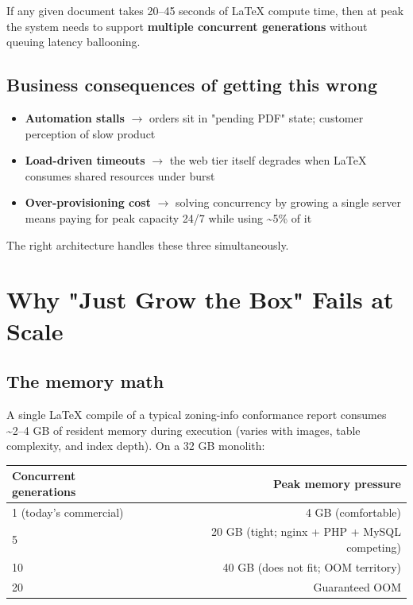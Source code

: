 \documentclass[11pt,letterpaper]{article}
\begin{document}
If any given document takes 20--45 seconds of LaTeX compute time, then at peak the system needs to support \textbf{multiple concurrent generations} without queuing latency ballooning.

\subsection{Business consequences of getting this wrong}
\begin{itemize}[nosep]
  \item \textbf{Automation stalls} $\rightarrow$ orders sit in "pending PDF" state; customer perception of slow product
  \item \textbf{Load-driven timeouts} $\rightarrow$ the web tier itself degrades when LaTeX consumes shared resources under burst
  \item \textbf{Over-provisioning cost} $\rightarrow$ solving concurrency by growing a single server means paying for peak capacity 24/7 while using \textasciitilde 5\% of it
\end{itemize}
The right architecture handles these three simultaneously.

\newpage

\section{Why "Just Grow the Box" Fails at Scale}
\label{sec:why-not-grow}

\subsection{The memory math}
A single LaTeX compile of a typical zoning-info conformance report consumes \textasciitilde 2--4 GB of resident memory during execution (varies with images, table complexity, and index depth). On a 32 GB monolith:

\begin{center}
\begin{tabular}{lr}
\toprule
\textbf{Concurrent generations} & \textbf{Peak memory pressure} \\
\midrule
1 (today's commercial) & 4 GB (comfortable) \\
5 & 20 GB (tight; nginx + PHP + MySQL competing) \\
10 & 40 GB (does not fit; OOM territory) \\
20 & Guaranteed OOM \\
\bottomrule
\end{tabular}
\end{center}
\end{document}
